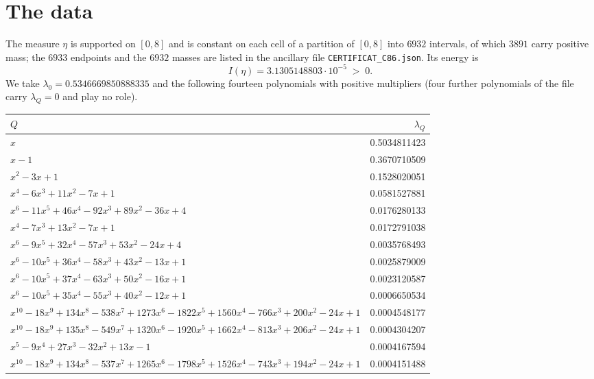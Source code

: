 \documentclass[11pt,a4paper]{article}
\begin{document}
\section{The data}\label{sec:data}

The measure $\eta$ is supported on $[0,8]$ and is constant on each cell of a
partition of $[0,8]$ into $6932$ intervals, of which $3891$ carry positive mass;
the $6933$ endpoints and the $6932$ masses are listed in the ancillary file
\texttt{CERTIFICAT\_C86.json}. Its energy is
\[
  I(\eta)=3.1305148803\cdot 10^{-5}\;>\;0 .
\]
We take $\lambda_0=0.5346669850888335$ and the following fourteen polynomials
with positive multipliers (four further polynomials of the file carry
$\lambda_Q=0$ and play no role).

\begin{center}\small
\begin{tabular}{lr}
\toprule
$Q$ & $\lambda_Q$\\
\midrule
$x$ & 0.5034811423 \\
$x - 1$ & 0.3670710509 \\
$x^{2} - 3x + 1$ & 0.1528020051 \\
$x^{4} - 6x^{3} + 11x^{2} - 7x + 1$ & 0.0581527881 \\
$x^{6} - 11x^{5} + 46x^{4} - 92x^{3} + 89x^{2} - 36x + 4$ & 0.0176280133 \\
$x^{4} - 7x^{3} + 13x^{2} - 7x + 1$ & 0.0172791038 \\
$x^{6} - 9x^{5} + 32x^{4} - 57x^{3} + 53x^{2} - 24x + 4$ & 0.0035768493 \\
$x^{6} - 10x^{5} + 36x^{4} - 58x^{3} + 43x^{2} - 13x + 1$ & 0.0025879009 \\
$x^{6} - 10x^{5} + 37x^{4} - 63x^{3} + 50x^{2} - 16x + 1$ & 0.0023120587 \\
$x^{6} - 10x^{5} + 35x^{4} - 55x^{3} + 40x^{2} - 12x + 1$ & 0.0006650534 \\
$x^{10} - 18x^{9} + 134x^{8} - 538x^{7} + 1273x^{6} - 1822x^{5} + 1560x^{4} - 766x^{3} + 200x^{2} - 24x + 1$ & 0.0004548177 \\
$x^{10} - 18x^{9} + 135x^{8} - 549x^{7} + 1320x^{6} - 1920x^{5} + 1662x^{4} - 813x^{3} + 206x^{2} - 24x + 1$ & 0.0004304207 \\
$x^{5} - 9x^{4} + 27x^{3} - 32x^{2} + 13x - 1$ & 0.0004167594 \\
$x^{10} - 18x^{9} + 134x^{8} - 537x^{7} + 1265x^{6} - 1798x^{5} + 1526x^{4} - 743x^{3} + 194x^{2} - 24x + 1$ & 0.0004151488 \\
\bottomrule
\end{tabular}
\end{center}
\end{document}
